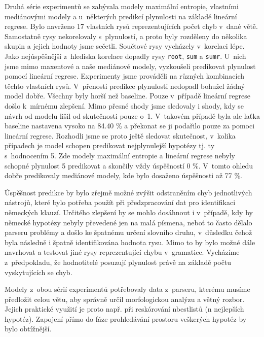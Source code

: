 \documentclass[12pt,a4paper]{report}
\let\openright=\clearpage
\def\chapwithtoc#1{
\chapter*{#1}
\addcontentsline{toc}{chapter}{#1}
}
\begin{document}
Druhá série experimentů se zabývala modely maximální entropie, vlastními mediánovými modely a u~některých predikcí plynulosti na základě lineární regrese. Bylo navrženo 17 vlastních rysů reprezentujících počet chyb v~dané větě. Samostatně rysy nekorelovaly s~plynulostí, a proto byly rozděleny do několika skupin a jejich hodnoty jsme sečetli. Součtové rysy vycházely v~korelaci lépe. Jako nejúspěšnější z~hlediska korelace dopadly rysy \texttt{root}, \texttt{sum} a \texttt{sumr}. U~nich jsme mimo maxentové a naše mediánové modely, vyzkoušeli predikovat plynulost pomocí lineární regrese. Experimenty jsme prováděli na různých kombinacích těchto vlastních rysů. V~přenosti predikce plynulosti nedopadl bohužel žádný model dobře. Všechny byly horší než baseline. Pouze v~případě lineární regrese došlo k~mírnému zlepšení. Mimo přesné shody jsme sledovaly i shody, kdy se návrh od modelu lišil od skutečnosti pouze o~1. V~takovém případě byla ale laťka baseline nastavena vysoko na 84.40 \% a překonat se ji podařilo pouze za pomoci lineární regrese. Rozhodli jsme se proto ještě sledovat skutečnost, v~kolika případech je model schopen predikovat nejplynulejší hypotézy tj. ty s~hodnocením 5. Zde modely maximální entropie a lineární regrese nebyly schopné plynulost 5 predikovat a skončily vždy úspěšností 0 \%. V~tomto ohledu dobře predikovaly mediánové modely, kde bylo dosaženo úspěšnosti až 77 \%.

Úspěšnost predikce by bylo zřejmě možné zvýšit odstraněním chyb jednotlivých nástrojů, které bylo potřeba použít při předzpracování dat pro identifikaci německých klauzí. Určitého zlepšení by se mohlo dosáhnout i v~případě, kdy by německé hypotézy nebyly převedené jen na malá písmena, neboť to často dělalo parseru problémy a došlo ke špatnému určení slovního druhu, v~důsledku čehož byla následně i špatně identifikována hodnota rysu. Mimo to by bylo možné dále navrhovat a testovat jiné rysy reprezentující chybu v~gramatice. Vycházíme z~předpokladu, že hodnotitelé posuzují plynulost právě na základě počtu vyskytujících se chyb.

Modely z~obou sérií experimentů potřebovaly data z~parseru, kterému musíme předložit celou větu, aby správně určil morfologickou analýzu a větný rozbor. Jejich praktické využití je proto např. při reskórování nbestlistů (n nejlepších hypotéz). Zapojení přímo do fáze prohledávání prostoru veškerých hypotéz by bylo obtížnější.




\listoffigures
{}



\listoftables
{}



\openright
\end{document}
